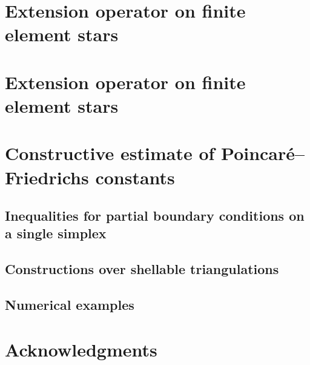 \documentclass[a4paper]{article}
\begin{document}
\section{Extension operator on finite element stars}






\section{Extension operator on finite element stars}\label{section:extension}

\section{Constructive estimate of Poincar\'e--Friedrichs constants}\label{section:poincarefriedrichs}

\subsection{Inequalities for partial boundary conditions on a single simplex}

\subsection{Constructions over shellable triangulations}

\subsection{Numerical examples}



\section*{Acknowledgments}



\end{document}
